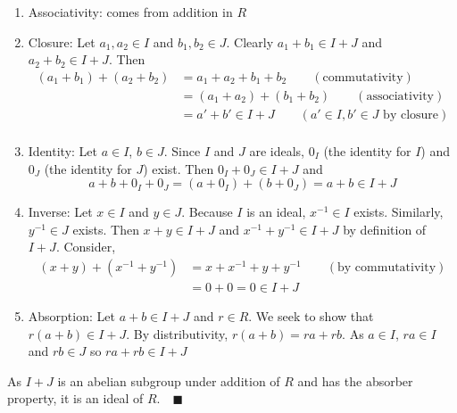 \documentclass[12pt]{article}
\newcommand{\qed}{\quad \blacksquare}
\begin{document}
\begin{enumerate}[label=(\alph*)]
            \color{blue}
                \begin{enumerate}
                    \item Associativity: comes from addition in $R$
                    
                    \item Closure: Let $a_1, a_2 \in I$ and $b_1, b_2 \in J$. Clearly $a_1 + b_1 \in I + J$ and $a_2 + b_2 \in I + J$. Then 
                    \begin{align*}
                        (a_1 + b_1) + (a_2 + b_2) &= a_1 + a_2 + b_1 + b_2 \qquad (\text{commutativity})\\
                        &= (a_1 + a_2) + (b_1 + b_2) \qquad (\text{associativity})\\
                        &= a' + b' \in I + J \qquad (a' \in I, b' \in J \text{ by closure})\\
                    \end{align*}
                    
                    \item Identity: Let $a \in I$, $b \in J$. Since $I$ and $J$ are ideals, $0_I$ (the identity for $I$) and $0_J$ (the identity for $J$) exist. Then $0_I + 0_J \in I + J$ and 
                    \[a + b + 0_I + 0_J = (a + 0_I) + (b + 0_J) = a + b \in I + J\]
                    
                    \item Inverse: Let $x \in I$ and $y \in J$. Because $I$ is an ideal, $x^{-1} \in I$ exists. Similarly, $y^{-1} \in J$ exists. Then $x + y \in I + J$ and $x^{-1} + y^{-1} \in I + J$ by definition of $I + J$. Consider, 
                    \begin{align*}
                        (x + y) + (x^{-1} + y^{-1}) &= x + x^{-1} + y + y^{-1} \qquad (\text{by commutativity})\\
                        &= 0 + 0 = 0 \in I + J
                    \end{align*}
                    
                    \item Absorption: Let $a + b \in I + J$ and $r \in R$. We seek to show that $r(a + b) \in I + J$. By distributivity, $r(a + b) = ra + rb$. As $a \in I$, $ra \in I$ and $rb \in J$ so $ra + rb \in I + J$
                \end{enumerate}
                As $I + J$ is an abelian subgroup under addition of $R$ and has the absorber property, it is an ideal of $R. \qed$
            \color{black}


\end{enumerate}
\end{document}

